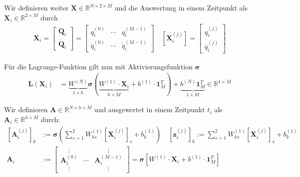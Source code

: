 \documentclass[a4paper, 12pt]{scrartcl}
\begin{document}
Wir definieren weiter $\bm{X} \in \mathbb{R}^{N \times 2 \times M}$ 
und die Auswertung in einem Zeitpunkt als $\bm{X}_i \in \mathbb{R}^{2 \times M}$ durch
\begin{align*}
    \bm{X}_i = 
    \begin{bmatrix}
        \bm{Q}_i \\
        \bm{\dot{Q}}_i 
    \end{bmatrix}
    =
    \begin{bmatrix}
        q_{i}^{(0)}         & \cdots & q_{i}^{(M-1)} \\
        \dot{q}_{i}^{(0)}   & \cdots & \dot{q}_{i}^{(M-1)}
    \end{bmatrix}
    \quad
    \left[\bm{X}_i^{(j)}\right]
    =
    \begin{bmatrix}
        q^{(j)}_i \\
        \dot{q}^{(j)}_i
    \end{bmatrix}
\end{align*}

Für die Lagrange-Funktion gilt nun mit Aktivierungsfunktion $\bm{\sigma}$
\begin{align*}
    \bm{L}(\bm{X}_i)
    &=
    \underbrace{
        W^{(N)}
    }_{1 \times h}
    \bm{\sigma}
    \left(
        \underbrace{
            W^{(1)}
            \cdot
            \bm{X}_i
        }_{h \times M}
        +
        b^{(1)} \cdot \bm{1}_M^T
    \right) + 
    \underbrace{
        b^{(N)} \bm{1}_M^T
    }_{1 \times M}
    \in \mathbb{R}^{1 \times M}
\end{align*}

Wir definieren $\bm{A} \in \mathbb{R}^{N \times h \times M}$ und ausgewertet in einem Zeitpunkt $t_i$ als 
$\bm{A}_i \in \mathbb{R}^{h \times M}$ durch: 
\begin{align*}
    \left[\bm{A}^{(j)}_i\right]_k
    &:= 
    \bm{\sigma}
    \left(
        \sum_{s=1}^{2} W_{ks}^{(1)} \left[\bm{X}_i^{(j)}\right]_s  + b_k^{(1)}
    \right) 
    \quad
    \left[\bm{z}_i^{(j)}\right]_k
    := 
    \sum_{s=1}^{2} W_{ks}^{(1)} \left[\bm{X}_i^{(j)}\right]_s  + b_k^{(1)}
    \\
    \bm{A}_i 
    &:=
    \begin{bmatrix}
        \overset{\vert}{\underset{\vert}{\bm{A}_i^{(0)}}}  
        &
        \cdots
        &
        \overset{\vert}{\underset{\vert}{\bm{A}_i^{(M-1)}}} 
    \end{bmatrix}
    =
    \bm{\sigma}
    \left[
        W^{(1)} \cdot \bm{X}_i + b^{(1)} \cdot \bm{1}_M^T 
    \right] 
\end{align*}
\end{document}
